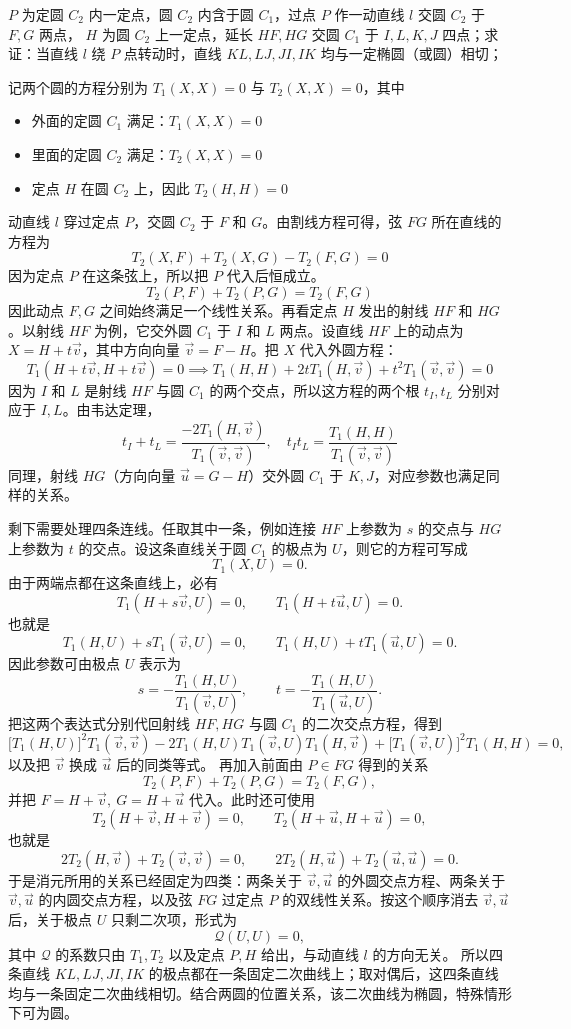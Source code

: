 \begin{exercise}
 $P$ 为定圆 $C_2$ 内一定点，圆 $C_2$ 内含于圆 $C_1$，过点 $P$ 作一动直线 $l$ 交圆 $C_2$ 于 $F,G$ 两点， $H$ 为圆 $C_2$ 上一定点，延长 $HF, HG$ 交圆 $C_1$ 于 $I,L,K,J$ 四点；求证：当直线 $l$ 绕 $P$ 点转动时，直线 $KL,LJ,JI,IK$ 均与一定椭圆（或圆）相切；
\end{exercise}
\begin{solution}
记两个圆的方程分别为 $T_1(X,X)=0$ 与 $T_2(X,X)=0$，其中
\begin{itemize}
\item 外面的定圆 $C_1$ 满足：$T_1(X,X) = 0$
\item 里面的定圆 $C_2$ 满足：$T_2(X,X) = 0$
\item 定点 $H$ 在圆 $C_2$ 上，因此 $T_2(H,H) = 0$
\end{itemize}
动直线 $l$ 穿过定点 $P$，交圆 $C_2$ 于 $F$ 和 $G$。由割线方程可得，弦 $FG$ 所在直线的方程为
$$T_2(X,F) + T_2(X,G) - T_2(F,G) = 0$$
因为定点 $P$ 在这条弦上，所以把 $P$ 代入后恒成立。
$$T_2(P,F) + T_2(P,G) = T_2(F,G)$$
因此动点 $F,G$ 之间始终满足一个线性关系。再看定点 $H$ 发出的射线 $HF$ 和 $HG$。以射线 $HF$ 为例，它交外圆 $C_1$ 于 $I$ 和 $L$ 两点。设直线 $HF$ 上的动点为 $X = H + t\vec{v}$，其中方向向量 $\vec{v} = F - H$。把 $X$ 代入外圆方程：
$$T_1(H + t\vec{v}, H + t\vec{v}) = 0\implies T_1(H,H) + 2t T_1(H,\vec{v}) + t^2 T_1(\vec{v},\vec{v}) = 0$$
因为 $I$ 和 $L$ 是射线 $HF$ 与圆 $C_1$ 的两个交点，所以这方程的两个根 $t_I,t_L$ 分别对应于 $I,L$。由韦达定理，
$$t_I + t_L = \frac{-2T_1(H,\vec{v})}{T_1(\vec{v},\vec{v})}, \quad t_I t_L = \frac{T_1(H,H)}{T_1(\vec{v},\vec{v})}$$
同理，射线 $HG$（方向向量 $\vec{u} = G - H$）交外圆 $C_1$ 于 $K,J$，对应参数也满足同样的关系。

剩下需要处理四条连线。任取其中一条，例如连接 $HF$ 上参数为 $s$ 的交点与 $HG$ 上参数为 $t$ 的交点。设这条直线关于圆 $C_1$ 的极点为 $U$，则它的方程可写成
\[
T_1(X,U)=0.
\]
由于两端点都在这条直线上，必有
\[
T_1(H+s\vec v,U)=0,\qquad T_1(H+t\vec u,U)=0.
\]
也就是
\[
T_1(H,U)+sT_1(\vec v,U)=0,\qquad
T_1(H,U)+tT_1(\vec u,U)=0.
\]
因此参数可由极点 $U$ 表示为
\[
s=-\frac{T_1(H,U)}{T_1(\vec v,U)},\qquad
t=-\frac{T_1(H,U)}{T_1(\vec u,U)}.
\]
把这两个表达式分别代回射线 $HF,HG$ 与圆 $C_1$ 的二次交点方程，得到
\[
\big[T_1(H,U)\big]^2T_1(\vec v,\vec v)
-2T_1(H,U)T_1(\vec v,U)T_1(H,\vec v)
+\big[T_1(\vec v,U)\big]^2T_1(H,H)=0,
\]
以及把 $\vec v$ 换成 $\vec u$ 后的同类等式。
再加入前面由 $P\in FG$ 得到的关系
\[
T_2(P,F)+T_2(P,G)=T_2(F,G),
\]
并把 $F=H+\vec v,\ G=H+\vec u$ 代入。此时还可使用
\[
T_2(H+\vec v,H+\vec v)=0,\qquad T_2(H+\vec u,H+\vec u)=0,
\]
也就是
\[
2T_2(H,\vec v)+T_2(\vec v,\vec v)=0,\qquad
2T_2(H,\vec u)+T_2(\vec u,\vec u)=0.
\]
于是消元所用的关系已经固定为四类：两条关于 $\vec v,\vec u$ 的外圆交点方程、两条关于 $\vec v,\vec u$ 的内圆交点方程，以及弦 $FG$ 过定点 $P$ 的双线性关系。按这个顺序消去 $\vec v,\vec u$ 后，关于极点 $U$ 只剩二次项，形式为
\[
\mathcal Q(U,U)=0,
\]
其中 $\mathcal Q$ 的系数只由 $T_1,T_2$ 以及定点 $P,H$ 给出，与动直线 $l$ 的方向无关。
所以四条直线 $KL,LJ,JI,IK$ 的极点都在一条固定二次曲线上；取对偶后，这四条直线均与一条固定二次曲线相切。结合两圆的位置关系，该二次曲线为椭圆，特殊情形下可为圆。
\end{solution}

